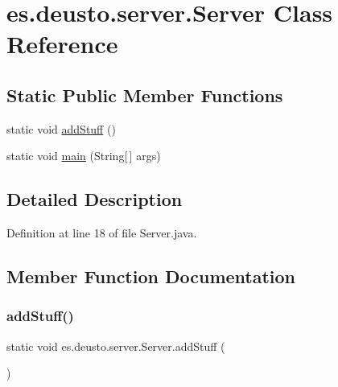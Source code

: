 \hypertarget{classes_1_1deusto_1_1server_1_1_server}{}\section{es.\+deusto.\+server.\+Server Class Reference}
\label{classes_1_1deusto_1_1server_1_1_server}
\subsection*{Static Public Member Functions}
\begin{DoxyCompactItemize}
\item 
static void \hyperlink{classes_1_1deusto_1_1server_1_1_server_a071095cdd445e2194fff31d86c874679}{add\+Stuff} ()
\item 
static void \hyperlink{classes_1_1deusto_1_1server_1_1_server_a750bb0d7dbd89246a3602f2e20d03fb5}{main} (String\mbox{[}$\,$\mbox{]} args)
\end{DoxyCompactItemize}


\subsection{Detailed Description}


Definition at line 18 of file Server.\+java.



\subsection{Member Function Documentation}
\mbox{\label{classes_1_1deusto_1_1server_1_1_server_a071095cdd445e2194fff31d86c874679}} 
\subsubsection{\texorpdfstring{add\+Stuff()}{addStuff()}}
{\footnotesize\ttfamily static void es.\+deusto.\+server.\+Server.\+add\+Stuff (\begin{DoxyParamCaption}{ }\end{DoxyParamCaption})\hspace{0.3cm}{\ttfamily [static]}}



